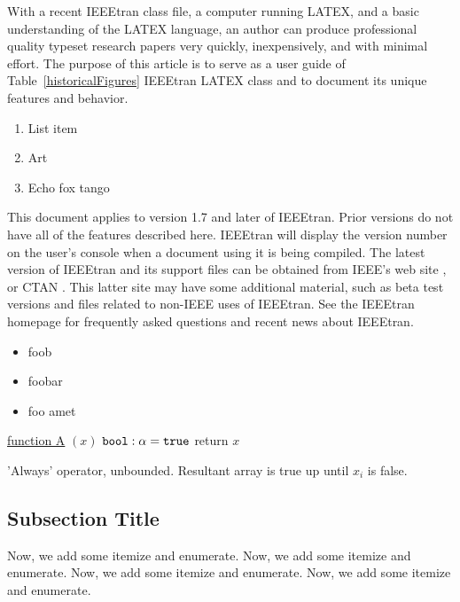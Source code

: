 \documentclass[10pt,conference,compsocconf]{IEEEtran}
\begin{document}
With a recent IEEEtran class file, a computer running LATEX, and a basic
understanding of the LATEX language, an author can produce professional quality
typeset research papers very quickly, inexpensively, and with minimal effort.
The purpose of this article is to serve as a user guide of Table~\ref{historicalFigures}
IEEEtran LATEX class and to document its unique features and behavior.

\begin{enumerate}
\item List item
\item Art
\item Echo fox tango
\end{enumerate}

This document applies to version 1.7 and later of IEEEtran. Prior versions do
not have all of the features described here. IEEEtran will display the version
number on the user’s console when a document using it is being compiled. The
latest version of IEEEtran and its support files can be obtained from IEEE’s web
site \cite{Firstman:2014}, or CTAN \cite{Fubtutorial:2014}. This latter site may have some
additional material, such as beta test versions and files related to non-IEEE
uses of IEEEtran. See the IEEEtran homepage \cite{Bookman:2014} for frequently asked
questions and recent news about IEEEtran.

\begin{itemize}
\item foob
\item foobar
\item foo amet
\end{itemize}

\begin{algorithm}[ht]
\underline{function A} $(x)$\;
$\tt{bool}: \alpha = \tt{true}$\;
return $x$\;
\caption{'Always' operator, unbounded.  Resultant array is true up until $x_i$ is false.}
\end{algorithm}\subsection{Subsection Title}
\label{subsectiontitle}

Now, we add some itemize and enumerate. Now, we add some itemize and enumerate.
Now, we add some itemize and enumerate. Now, we add some itemize and enumerate.
\end{document}
